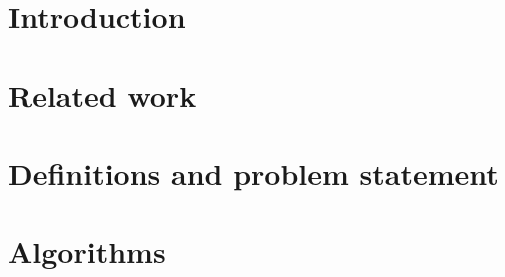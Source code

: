 \documentclass{article}
\begin{document}

\clearpage
\section{Introduction}

\section{Related work}

\section{Definitions and problem statement}\label{sec:pf}

\section{Algorithms}



\end{document}
